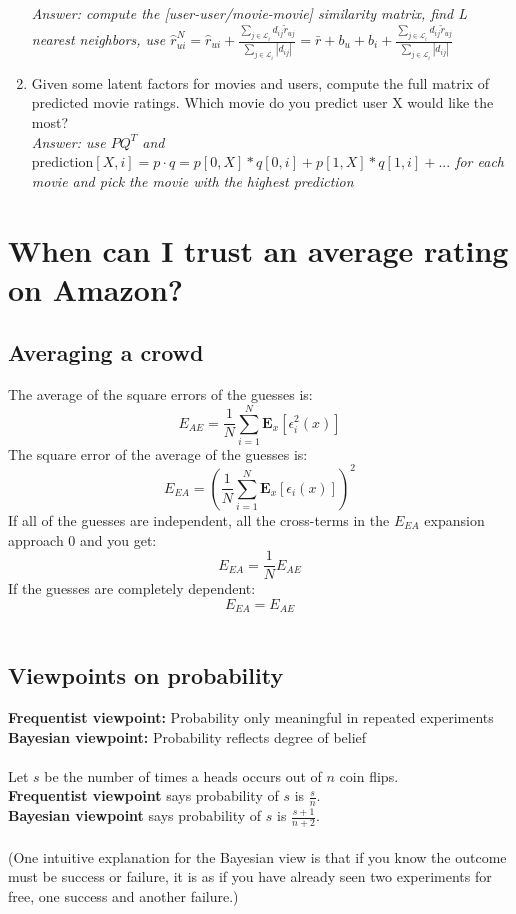 \documentclass{article}
\newcommand{\MatrixVariable}[1]{\bm{\mathit{#1}}}
\begin{document}
\begin{enumerate}
\textit{Answer: compute the [user-user/movie-movie] similarity matrix, find L nearest neighbors, use $\hat{r}_{ui}^N = \hat{r}_{ui} + \frac{\sum_{j \in \mathcal{L}_i} d_{ij} \tilde{r}_{uj}}{\sum_{j \in \mathcal{L}_i} |d_{ij}|} = \bar{r} + b_u + b_i + \frac{\sum_{j \in \mathcal{L}_i} d_{ij} \tilde{r}_{uj}}{\sum_{j \in \mathcal{L}_i} |d_{ij}|}$}
\item Given some latent factors for movies and users, compute the full matrix of predicted movie ratings. Which movie do you predict user X would like the most? \\
\textit{Answer: use $\MatrixVariable{P}\MatrixVariable{Q}^T$ and $\text{prediction}[X,i] = \MatrixVariable{p} \cdot \MatrixVariable{q} = p[0,X]*q[0,i] + p[1,X]*q[1,i] + ...$ for each movie and pick the movie with the highest prediction}
\end{enumerate}

\section{When can I trust an average rating on Amazon?}

\subsection{Averaging a crowd}

The average of the square errors of the guesses is:
$$E_{AE} = \frac{1}{N}\sum_{i=1}^{N}\textbf{E}_x[\epsilon_i^2(x)]$$
The square error of the average of the guesses is:
$$E_{EA} = \left( \frac{1}{N}\sum_{i=1}^{N}\textbf{E}_x[\epsilon_i(x)] \right)^2$$
If all of the guesses are independent, all the cross-terms in the $E_{EA}$ expansion approach 0 and you get:
$$E_{EA} = \frac{1}{N} E_{AE}$$
If the guesses are completely dependent:
$$E_{EA} = E_{AE}$$ \\

\subsection{Viewpoints on probability}

\textbf{Frequentist viewpoint:} Probability only meaningful in repeated experiments \\
\textbf{Bayesian viewpoint:} Probability reflects degree of belief \\
\\
Let $s$ be the number of times a heads occurs out of $n$ coin flips. \\
\textbf{Frequentist viewpoint} says probability of $s$ is $\frac{s}{n}$. \\
\textbf{Bayesian viewpoint} says probability of $s$ is $\frac{s+1}{n+2}$. \\
\\
(One intuitive explanation for the Bayesian view is that if you know the outcome must be success or failure, it is as if you have already seen two experiments for free, one success and another failure.) \\
\end{document}
